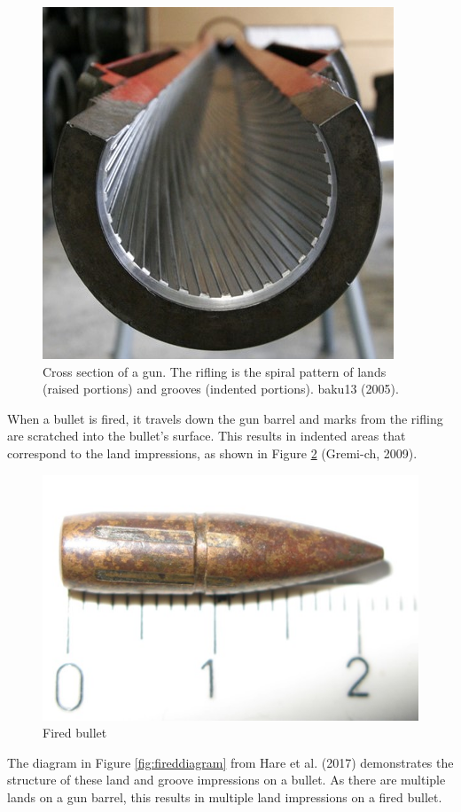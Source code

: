 \documentclass[print]{nuthesis}
\begin{document}
\begin{figure}

{\centering \includegraphics[width=0.5\linewidth]{images/rifling} 

}

\caption[Cross section of a gun.]{Cross section of a gun. The rifling is the spiral pattern of lands (raised portions) and grooves (indented portions). baku13 (2005).}\label{fig:rifling}
\end{figure}

When a bullet is fired, it travels down the gun barrel and marks from the rifling are scratched into the bullet's surface.
This results in indented areas that correspond to the land impressions, as shown in Figure \ref{fig:fired} (Gremi-ch, 2009).

\begin{figure}

{\centering \includegraphics[width=0.5\linewidth]{images/fired_bullet} 

}

\caption{Fired bullet}\label{fig:fired}
\end{figure}

The diagram in Figure \ref{fig:fireddiagram} from Hare et al. (2017) demonstrates the structure of these land and groove impressions on a bullet.
As there are multiple lands on a gun barrel, this results in multiple land impressions on a fired bullet.
\end{document}
